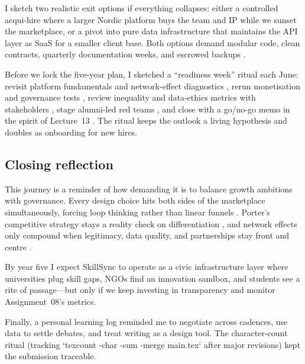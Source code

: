 I sketch two realistic exit options if everything collapses: either a controlled acqui-hire where a larger Nordic platform buys the team and IP while we sunset the marketplace, or a pivot into pure data infrastructure that maintains the API layer as SaaS for a smaller client base. Both options demand modular code, clean contracts, quarterly documentation weeks, and escrowed backups \citep{Reillier2017}.

Before we lock the five-year plan, I sketched a ``readiness week'' ritual each June: revisit platform fundamentals and network-effect diagnostics \citep{Lecture01,Lecture02}, rerun monetisation and governance tests \citep{Lecture05,Lecture10}, review inequality and data-ethics metrics with stakeholders \citep{Lecture08,Lecture11}, stage alumni-led red teams \citep{Lecture12}, and close with a go/no-go memo in the spirit of Lecture~13 \citep{Lecture13}. The ritual keeps the outlook a living hypothesis and doubles as onboarding for new hires.

\subsection*{Closing reflection}
This journey is a reminder of how demanding it is to balance growth ambitions with governance. Every design choice hits both sides of the marketplace simultaneously, forcing loop thinking rather than linear funnels \citep{Choudary2016}. Porter’s competitive strategy stays a reality check on differentiation \citep{Porter2008}, and network effects only compound when legitimacy, data quality, and partnerships stay front and centre \citep{Srnicek2017}.

By year five I expect SkillSync to operate as a civic infrastructure layer where universities plug skill gaps, NGOs find an innovation sandbox, and students see a rite of passage---but only if we keep investing in transparency and monitor Assignment~08's metrics.

Finally, a personal learning log reminded me to negotiate across cadences, use data to settle debates, and treat writing as a design tool. The character-count ritual (tracking `texcount -char -sum -merge main.tex` after major revisions) kept the submission traceable.
